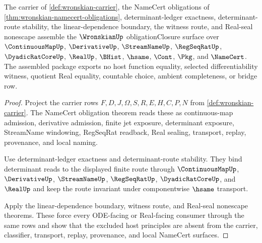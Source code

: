 \begin{theorem}
\label{thm:wronskian-obligation-closure-package}
The carrier of \autoref{def:wronskian-carrier}, the NameCert obligations of \autoref{thm:wronskian-namecert-obligations}, determinant-ledger exactness, determinant-route stability, the linear-dependence boundary, the witness route, and Real-seal nonescape assemble the $\WronskianUp$ obligationClosure surface over $\ContinuousMapUp$, $\DerivativeUp$, $\StreamNameUp$, $\RegSeqRatUp$, $\DyadicRatCoreUp$, $\RealUp$, $\BHist$, $\hsame$, $\Cont$, $\Pkg$, and $\NameCert$. The assembled package exports no host function equality, selected differentiability witness, quotient Real equality, countable choice, ambient completeness, or bridge row.
\end{theorem}
\begin{proof}
Project the carrier rows $F,D,J,\Omega,S,R,E,H,C,P,N$ from \autoref{def:wronskian-carrier}. The NameCert obligation theorem reads these as continuous-map admission, derivative admission, finite jet exposure, determinant exposure, StreamName windowing, RegSeqRat readback, Real sealing, transport, replay, provenance, and local naming.

Use determinant-ledger exactness and determinant-route stability. They bind determinant reads to the displayed finite route through $\ContinuousMapUp$, $\DerivativeUp$, $\StreamNameUp$, $\RegSeqRatUp$, $\DyadicRatCoreUp$, and $\RealUp$ and keep the route invariant under componentwise $\hsame$ transport.

Apply the linear-dependence boundary, witness route, and Real-seal nonescape theorems. These force every ODE-facing or Real-facing consumer through the same rows and show that the excluded host principles are absent from the carrier, classifier, transport, replay, provenance, and local NameCert surfaces.
\end{proof}

